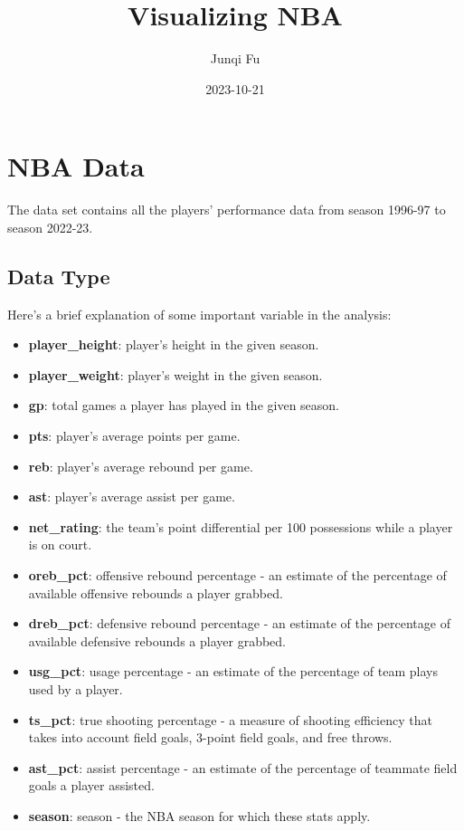 \documentclass[
]{book}
\title{Visualizing NBA}
\author{Junqi Fu}
\date{2023-10-21}
\providecommand{\tightlist}{%
  \setlength{\itemsep}{0pt}\setlength{\parskip}{0pt}}
\begin{document}
\maketitle

{
\hypersetup{linkcolor=}
\setcounter{tocdepth}{2}
\tableofcontents
}
\hypertarget{nba-data}{%
\chapter{NBA Data}\label{nba-data}}

The data set contains all the players' performance data from season 1996-97 to season 2022-23.

\hypertarget{data-type}{%
\section{Data Type}\label{data-type}}

Here's a brief explanation of some important variable in the analysis:

\begin{itemize}
\tightlist
\item
  \textbf{player\_height}: player's height in the given season.
\item
  \textbf{player\_weight}: player's weight in the given season.
\item
  \textbf{gp}: total games a player has played in the given season.
\item
  \textbf{pts}: player's average points per game.
\item
  \textbf{reb}: player's average rebound per game.
\item
  \textbf{ast}: player's average assist per game.
\item
  \textbf{net\_rating}: the team's point differential per 100 possessions while a player is on court.
\item
  \textbf{oreb\_pct}: offensive rebound percentage - an estimate of the percentage of available offensive rebounds a player grabbed.
\item
  \textbf{dreb\_pct}: defensive rebound percentage - an estimate of the percentage of available defensive rebounds a player grabbed.
\item
  \textbf{usg\_pct}: usage percentage - an estimate of the percentage of team plays used by a player.
\item
  \textbf{ts\_pct}: true shooting percentage - a measure of shooting efficiency that takes into account field goals, 3-point field goals, and free throws.
\item
  \textbf{ast\_pct}: assist percentage - an estimate of the percentage of teammate field goals a player assisted.
\item
  \textbf{season}: season - the NBA season for which these stats apply.
\end{itemize}
\end{document}
